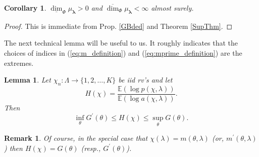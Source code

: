\documentclass{amsart}
\newtheorem{corollary}[theorem]{Corollary}
\newtheorem{lemma}[theorem]{Lemma}
\theoremstyle{plain}
\newtheorem{remark}{Remark}
\numberwithin{equation}{section}
\newcommand{\blambda}{{\boldsymbol{\lambda}}}
\newcommand{\ee}{{\mathbb E}}
\newcommand{\odim}{\overline{\dim}}
\newcommand{\udim}{\underline{\dim}}
\begin{document}
\begin{corollary}
$\udim_{\Phi}\mu_\blambda>0$ and $\odim_{\Phi}\mu_\blambda<\infty $ almost surely.
\end{corollary}

\begin{proof}
This is immediate from   Prop. \ref{GBded} and Theorem \ref{SupThm}.
\end{proof}

The next technical lemma will be useful to us.  
It roughly indicates that the choices of indices in (\ref{eq:m_definition}) and (\ref{eq:mprime_definition}) are the extremes.

\begin{lemma}
\label{lem:H-function}
Let $\chi _{n}:\Lambda \to \{1,2, \ldots, K\}$ be iid rv's  and let 
\begin{equation*}
    H(\chi )=\frac{\ee(\log p(\chi ,\lambda ))}{\ee(\log a(\chi,\lambda ))}.
\end{equation*}
Then 
\begin{equation*}
    \inf_{\theta }G^{\prime }(\theta )\leq H(\chi )\leq \sup_{\theta }G(\theta ).
\end{equation*}
\end{lemma}

\begin{remark}
Of course, in the special case that $\chi (\lambda )=m(\theta ,\lambda )$
(or, $m^{\prime }(\theta ,\lambda )$) then $H(\chi )=G(\theta )$ (resp., 
$G^{\prime }(\theta )$).
\end{remark}
\end{document}
